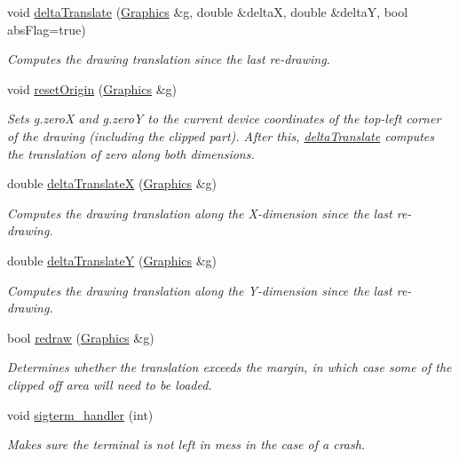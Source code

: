 \begin{DoxyCompactItemize}
void \hyperlink{namespaceslb_1_1core_1_1ui_ac32e15bebf42bd64ce1dd79b29fd4060}{delta\+Translate} (\hyperlink{structslb_1_1core_1_1ui_1_1Graphics}{Graphics} \&g, double \&deltaX, double \&deltaY, bool abs\+Flag=true)
\begin{DoxyCompactList}\small\item\em Computes the drawing translation since the last re-\/drawing. \end{DoxyCompactList}\item 
void \hyperlink{namespaceslb_1_1core_1_1ui_afd86604f78b366f9c76a1a6789b25ae6}{reset\+Origin} (\hyperlink{structslb_1_1core_1_1ui_1_1Graphics}{Graphics} \&g)
\begin{DoxyCompactList}\small\item\em Sets {\ttfamily g.\+zeroX} and {\ttfamily g.\+zeroY} to the current device coordinates of the top-\/left corner of the drawing (including the clipped part). After this, \hyperlink{namespaceslb_1_1core_1_1ui_ac32e15bebf42bd64ce1dd79b29fd4060}{delta\+Translate} computes the translation of zero along both dimensions. \end{DoxyCompactList}\item 
double \hyperlink{namespaceslb_1_1core_1_1ui_a53e1eecbdf9fc3968ec3329cd8037d8b}{delta\+TranslateX} (\hyperlink{structslb_1_1core_1_1ui_1_1Graphics}{Graphics} \&g)
\begin{DoxyCompactList}\small\item\em Computes the drawing translation along the X-\/dimension since the last re-\/drawing. \end{DoxyCompactList}\item 
double \hyperlink{namespaceslb_1_1core_1_1ui_a34759b10173dfdb7d3039fd8ef723467}{delta\+TranslateY} (\hyperlink{structslb_1_1core_1_1ui_1_1Graphics}{Graphics} \&g)
\begin{DoxyCompactList}\small\item\em Computes the drawing translation along the Y-\/dimension since the last re-\/drawing. \end{DoxyCompactList}\item 
bool \hyperlink{namespaceslb_1_1core_1_1ui_a1e3c4987555edac188707140195b73bb}{redraw} (\hyperlink{structslb_1_1core_1_1ui_1_1Graphics}{Graphics} \&g)
\begin{DoxyCompactList}\small\item\em Determines whether the translation exceeds the margin, in which case some of the clipped off area will need to be loaded. \end{DoxyCompactList}\item 
void \hyperlink{namespaceslb_1_1core_1_1ui_ab3f223fc7935031e512b8a351e3fb5d2}{sigterm\+\_\+handler} (int)\hypertarget{namespaceslb_1_1core_1_1ui_ab3f223fc7935031e512b8a351e3fb5d2}{}\label{namespaceslb_1_1core_1_1ui_ab3f223fc7935031e512b8a351e3fb5d2}

\begin{DoxyCompactList}\small\item\em Makes sure the terminal is not left in mess in the case of a crash. \end{DoxyCompactList}\end{DoxyCompactItemize}


